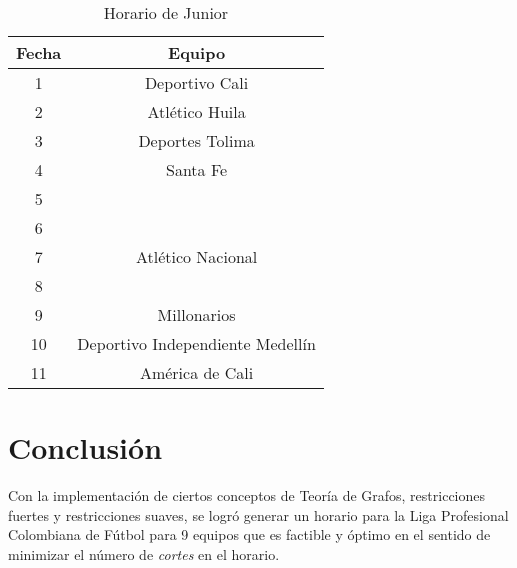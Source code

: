 \documentclass[11pt]{article}
\begin{document}
\begin{multicols}{2}
            \begin{table}[H]
                \centering
                \begin{tabular}{|c||c|}
                    \hline
                    Fecha & Equipo\\ \hline
                    1 & Deportivo Cali\\ \hline
                    2 & Atlético Huila \\ \hline
                    3 & Deportes Tolima  \\ \hline
                    4 & Santa Fe \\ \hline
                    5 &  \\ \hline
                    6 &  \\ \hline
                    7 & Atlético Nacional \\ \hline
                    8 & \\ \hline
                    9 & Millonarios \\ \hline
                    10 & Deportivo Independiente Medellín \\ \hline
                    11 & América de Cali \\ \hline
                \end{tabular} 
                \caption{Horario de Junior}
            \end{table}
                    
            \section{Conclusión}
            Con la implementación de ciertos conceptos de Teoría de Grafos, restricciones fuertes y restricciones suaves, se logró generar un horario para la Liga Profesional Colombiana de Fútbol para 9 equipos 
            que es factible y óptimo en el sentido de minimizar el número de \textit{cortes} en el horario.
            

\end{multicols}
\end{document}
